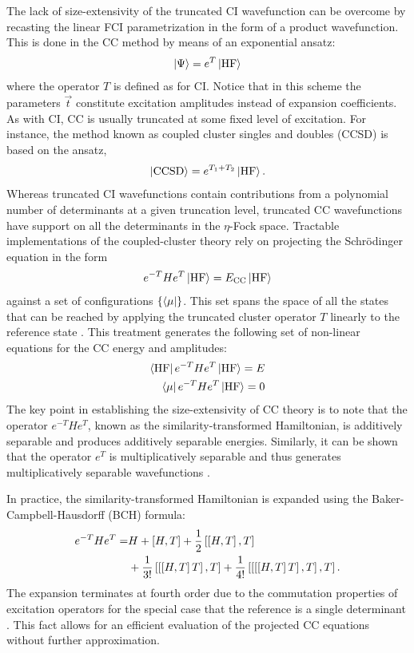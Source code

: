 \documentclass[superscriptaddress,aps,pra,twocolumn,nofootinbib,babel]{revtex4-1}
\def\bra#1{\mathinner{\langle{#1}|}}
\def\ket#1{\mathinner{|{#1}\rangle}}
\begin{document}
The lack of size-extensivity of the truncated CI wavefunction can be overcome by recasting the linear FCI parametrization in the form of a product wavefunction. This is done in the CC method by means of an exponential ansatz:
\begin{align}
\ket{\Psi} = e^{T} \ket{\textrm{HF}}
\end{align}
where the operator $T$ is defined as for CI. Notice that in this scheme the parameters $\vec{t}$ constitute excitation amplitudes instead of expansion coefficients. As with CI, CC is usually truncated at some fixed level of excitation. For instance, the method known as coupled cluster singles and doubles (CCSD) is based on the ansatz,
\begin{equation}
\ket{\textrm{CCSD}} = e^{T_1 + T_2} \ket{\textrm{HF}}.
\end{equation}
Whereas truncated CI wavefunctions contain contributions from a polynomial number of determinants at a given truncation level, truncated CC wavefunctions have support on all the determinants in the $\eta$-Fock space. Tractable implementations of the coupled-cluster theory rely on projecting the Schr\"{o}dinger equation in the form
\begin{equation}
e^{-T} H e^{T} \ket{\textrm{HF}} = E_\mathrm{CC} \ket{\textrm{HF}}
\end{equation}
against a set of configurations $\{\bra{\mu}\}$. This set spans the space of all the states that can be reached by applying the truncated cluster operator $T$ linearly to the reference state \cite{Bartlett.RMP.79.291.2007}.  This treatment generates the following set of non-linear equations for the CC energy and amplitudes:
\begin{align}\label{eq:ccprojectede}
\bra{\textrm{HF}} e^{-T} H e^{T} \ket{\textrm{HF}} = E \\
\bra{\mu} e^{-T} H e^{T} \ket{\textrm{HF}} = 0
\end{align}
The key point in establishing the size-extensivity of CC theory is to note that the operator $e^{-T} H e^{T}$, known as the similarity-transformed Hamiltonian, is additively separable and produces additively separable energies. Similarly, it can be shown that the operator $e^{T}$ is multiplicatively separable and thus generates multiplicatively separable wavefunctions \cite{Helgaker2013}.

In practice, the similarity-transformed Hamiltonian is expanded using the  Baker-Campbell-Hausdorff (BCH) formula:
\begin{align}\label{eq:BCHCCC}
e^{-T} H e^{T} = & H + \left[H, T\right] + \frac{1}{2}\left[\left[H, T\right], T\right] \notag \\
& + \frac{1}{3!} \left[\left[\left[H, T\right] T\right], T\right] + \frac{1}{4!} \left[\left[\left[\left[H, T\right] T\right], T\right], T\right].
\end{align}
The expansion terminates at fourth order due to the commutation properties of excitation operators for the special case that the reference is a single determinant \cite{Bartlett.RMP.79.291.2007,Helgaker2013}. This fact allows for an efficient evaluation of the projected CC equations without further approximation.
\end{document}
